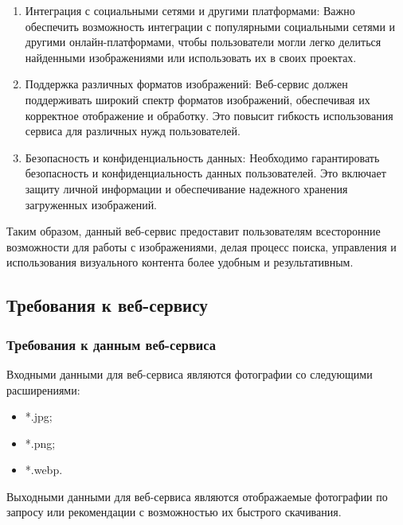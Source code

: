 \begin{enumerate}
	\item Интеграция с социальными сетями и другими платформами: Важно обеспечить возможность интеграции с популярными социальными сетями и другими онлайн-платформами, чтобы пользователи могли легко делиться найденными изображениями или использовать их в своих проектах.
	\item Поддержка различных форматов изображений: Веб-сервис должен поддерживать широкий спектр форматов изображений, обеспечивая их корректное отображение и обработку. Это повысит гибкость использования сервиса для различных нужд пользователей.
	\item Безопасность и конфиденциальность данных: Необходимо гарантировать безопасность и конфиденциальность данных пользователей. Это включает защиту личной информации и обеспечивание надежного хранения загруженных изображений.
\end{enumerate}

Таким образом, данный веб-сервис предоставит пользователям всесторонние возможности для работы с изображениями, делая процесс поиска, управления и использования визуального контента более удобным и результативным.

\subsection{Требования к веб-сервису}
\subsubsection{Требования к данным веб-сервиса}

Входными данными для веб-сервиса являются фотографии со следующими расширениями:

\begin{itemize}
	\item *.jpg;
	\item *.png;
	\item *.webp.
\end{itemize}

Выходными данными для веб-сервиса являются отображаемые фотографии по запросу или рекомендации с возможностью их быстрого скачивания.

